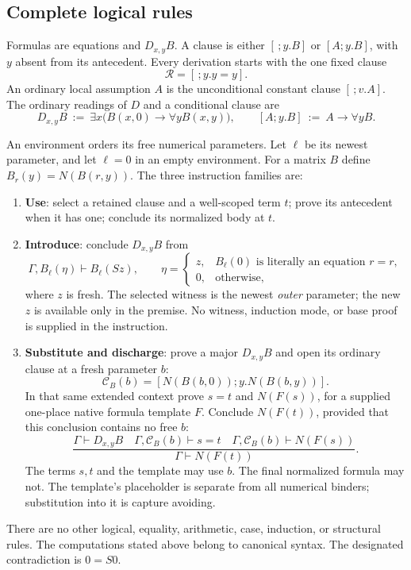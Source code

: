 \subsection{Complete logical rules}

Formulas are equations and $D_{x,y}B$.  A clause is either $[\,;y.B]$
or $[A;y.B]$, with $y$ absent from its antecedent.  Every derivation starts
with the one fixed clause
\[
                        \mathcal R=[\,;y.y=y].
\]
An ordinary local assumption $A$ is the unconditional constant clause
$[\,;v.A]$.  The ordinary readings of $D$ and a conditional clause are
\[
 D_{x,y}B\ :=\ \exists x\bigl(B(x,0)\to\forall y B(x,y)\bigr),
 \qquad [A;y.B]\ :=\ A\to\forall yB.
\]

An environment orders its free numerical parameters.  Let $\ell$ be its
newest parameter, and let $\ell=0$ in an empty environment.  For a matrix
$B$ define $B_r(y)=N(B(r,y))$.  The three instruction families are:
\begin{enumerate}
\item \textbf{Use}: select a retained clause and a well-scoped term $t$;
prove its antecedent when it has one; conclude its normalized body at $t$.
\item \textbf{Introduce}: conclude $D_{x,y}B$ from
\[
 \Gamma,B_\ell(\eta)\vdash B_\ell(Sz),
 \qquad
 \eta=\begin{cases}
 z,&B_\ell(0)\text{ is literally an equation }r=r,\\
 0,&\text{otherwise},
 \end{cases}
 \tag{I}\label{eq:new-i}
\]
where $z$ is fresh.  The selected witness is the newest \emph{outer}
parameter; the new $z$ is available only in the premise.  No witness,
induction mode, or base proof is supplied in the instruction.
\item \textbf{Substitute and discharge}: prove a major $D_{x,y}B$ and
open its ordinary clause at a fresh parameter $b$:
\[
             \mathcal C_B(b)=[N(B(b,0));y.N(B(b,y))].
\]
In that same extended context prove $s=t$ and $N(F(s))$, for a supplied
one-place native formula template $F$.  Conclude $N(F(t))$, provided that
this conclusion contains no free $b$:
\[
 \frac{\Gamma\vdash D_{x,y}B\quad
       \Gamma,\mathcal C_B(b)\vdash s=t\quad
       \Gamma,\mathcal C_B(b)\vdash N(F(s))}
      {\Gamma\vdash N(F(t))}.
 \tag{E}\label{eq:new-e}
\]
The terms $s,t$ and the template may use $b$.  The final normalized
formula may not.  The template's placeholder is separate from all
numerical binders; substitution into it is capture avoiding.
\end{enumerate}
There are no other logical, equality, arithmetic, case, induction, or
structural rules.  The computations stated above belong to canonical
syntax.  The designated contradiction is $0=S0$.

